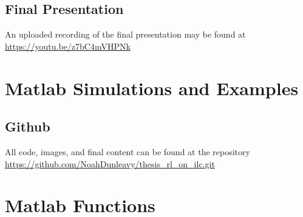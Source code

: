 \documentclass[12pt,american]{report}
\begin{document}
\section{Final Presentation}
An uploaded recording of the final presentation may be found at \url{https://youtu.be/z7bC4mVHPNk}

\chapter{Matlab Simulations and Examples}
\section{Github}
All code, images, and final content can be found at the repository \url{https://github.com/NoahDunleavy/thesis_rl_on_ilc.git}





\chapter{Matlab Functions}


















\printbibliography
{}
\singlespacing%
\end{document}
